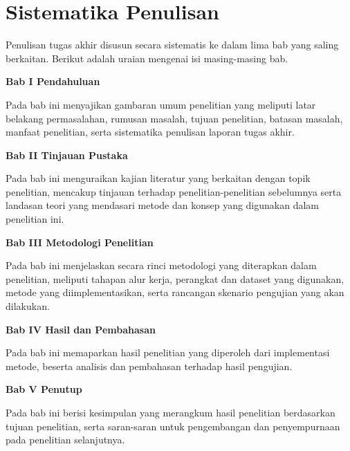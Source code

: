 \section{Sistematika Penulisan} \label{I.Sistematika}
Penulisan tugas akhir disusun secara sistematis ke dalam lima bab yang saling berkaitan. Berikut adalah uraian  mengenai isi masing-masing bab. \par

\noindent\textbf{Bab I Pendahuluan}

Pada bab ini menyajikan gambaran umum penelitian yang meliputi latar belakang permasalahan, rumusan masalah, tujuan penelitian, batasan masalah, manfaat penelitian, serta sistematika penulisan laporan tugas akhir. \par

\noindent\textbf{Bab II Tinjauan Pustaka}

Pada bab ini menguraikan kajian literatur yang berkaitan dengan topik penelitian, mencakup tinjauan terhadap penelitian-penelitian sebelumnya serta landasan teori yang mendasari metode dan konsep yang digunakan dalam penelitian ini. \par

\noindent\textbf{Bab III Metodologi Penelitian}

Pada bab ini menjelaskan secara rinci metodologi yang diterapkan dalam penelitian, meliputi tahapan alur kerja, perangkat dan dataset yang digunakan, metode yang diimplementasikan, serta rancangan skenario pengujian yang akan dilakukan. \par

\noindent\textbf{Bab IV Hasil dan Pembahasan}

Pada bab ini memaparkan hasil penelitian yang diperoleh dari implementasi metode, beserta analisis dan pembahasan terhadap hasil pengujian. \par

\noindent\textbf{Bab V Penutup}

Pada bab ini berisi kesimpulan yang merangkum hasil penelitian berdasarkan tujuan penelitian, serta saran-saran untuk pengembangan dan penyempurnaan pada penelitian selanjutnya.